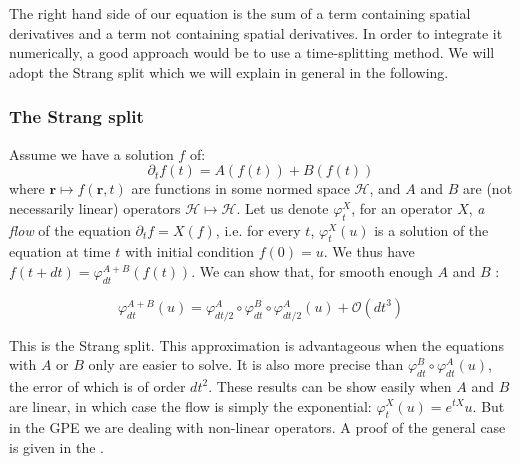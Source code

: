 \documentclass{article}
\begin{document}
\bigskip
The right hand side of our equation is the sum of a term containing spatial derivatives and a term not containing spatial derivatives. In order to integrate it numerically, a good approach would be to use a time-splitting method. We will adopt the Strang split which we will explain in general in the following.

\subsubsection*{The Strang split}
Assume we have a solution $f$ of:
$$
\partial_t f(t)= A(f(t))+B(f(t))
$$
where $\mathbf{r}\longmapsto f(\mathbf{r},t)$ are functions in some normed space $\mathcal{H}$, and $A$ and $B$ are (not necessarily linear) operators $\mathcal{H} \longmapsto \mathcal{H}$. Let us denote $\varphi^X_t$, for an operator $X$, \textit{a flow} of the equation $\partial_t f= X(f)$, i.e. for every $t$, $\varphi^X_t(u)$ is a solution of the equation at time $t$ with initial condition $f(0)=u$. We thus have $f(t+dt)=\varphi^{A+B}_{dt}(f(t))$. We can show that, for smooth enough $A$ and $B$ :

\bigskip
\begin{equation}\label{strangsplit}
    \varphi^{A+B}_{dt}(u)=\varphi^A_{dt/2}\circ\varphi^B_{dt}\circ\varphi^A_{dt/2}(u)+\mathcal{O}(dt^3)
\end{equation}

\bigskip\noindent
This is the Strang split. This approximation is advantageous when the equations with $A$ or $B$ only are easier to solve. It is also more precise than $\varphi^B_{dt}\circ\varphi^A_{dt}(u)$, the error of which is of order $dt^2$. These results can be show easily when $A$ and $B$ are linear, in which case the flow is simply the exponential: $\varphi^X_t(u)=e^{tX}u$. But in the GPE we are dealing with non-linear operators. A proof of the general case is given in the .
\end{document}
